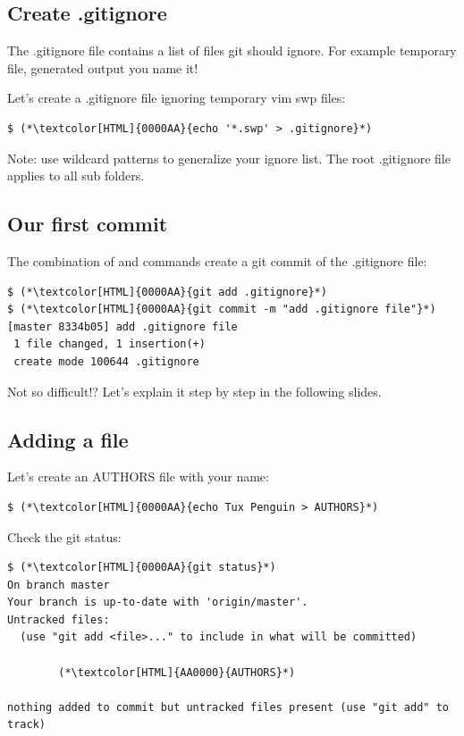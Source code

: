 \subsection{Create .gitignore}
\begin{frame}[fragile]
  \subslidetitle
  The .gitignore file contains a list of files git should ignore. For example temporary file, generated output you name it!

  \vspace{1em}
  Let's create a .gitignore file ignoring temporary vim swp files:
  \begin{lstlisting}
$ (*\textcolor[HTML]{0000AA}{echo '*.swp' > .gitignore}*)
\end{lstlisting}

  \vspace{1em}
  Note: use wildcard patterns to generalize your ignore list. The root .gitignore file applies to all sub folders.

\end{frame}

\subsection{Our first commit}
\begin{frame}[fragile]
  \subslidetitle

  The combination of  and  commands create a git commit of the .gitignore file:
  \begin{lstlisting}
$ (*\textcolor[HTML]{0000AA}{git add .gitignore}*)
$ (*\textcolor[HTML]{0000AA}{git commit -m "add .gitignore file"}*)
[master 8334b05] add .gitignore file
 1 file changed, 1 insertion(+)
 create mode 100644 .gitignore
\end{lstlisting}

Not so difficult!? Let's explain it step by step in the following slides.
\end{frame}

\subsection{Adding a file}
\begin{frame}[fragile]
  \subslidetitle

  Let's create an AUTHORS file with your name:
  \begin{lstlisting}
$ (*\textcolor[HTML]{0000AA}{echo Tux Penguin > AUTHORS}*)
\end{lstlisting}

  Check the git status:
  \begin{lstlisting}
$ (*\textcolor[HTML]{0000AA}{git status}*)
On branch master
Your branch is up-to-date with 'origin/master'.
Untracked files:
  (use "git add <file>..." to include in what will be committed)

        (*\textcolor[HTML]{AA0000}{AUTHORS}*)

nothing added to commit but untracked files present (use "git add" to track)
\end{lstlisting}

\end{frame}

